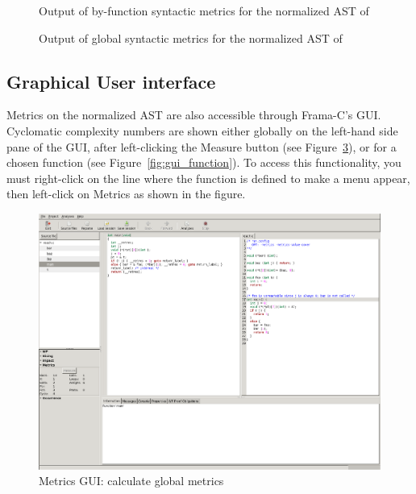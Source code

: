 \documentclass{frama-c-book}
\begin{document}
\begin{figure}[!ht]
  \centering
  
  \caption{Output of by-function syntactic metrics for the normalized AST of \pgname}
  \label{fig:cprog_output}
\end{figure}

\begin{figure}[!ht]
  \centering
  
  \caption{Output of global syntactic metrics for the normalized AST of \pgname}
  \label{fig:cprog_output2}
\end{figure}

\subsection{Graphical User interface}
\label{sec:gui}

Metrics on the normalized AST are also accessible through Frama-C's
GUI. Cyclomatic complexity numbers are shown either globally on the left-hand
side pane of the GUI, after left-clicking the {\sf Measure} button (see
Figure~\ref{fig:gui_global}), or for a chosen function (see
Figure~\ref{fig:gui_function}). To access this functionality, you must
right-click on the line  where the function is defined to make a menu appear,
then left-click on {\sf Metrics} as shown in the figure.

\begin{figure}[!ht]
  \centering
  \includegraphics[width=\linewidth]{img/metrics_gui_global.png}
  \caption{Metrics GUI: calculate global metrics}
  \label{fig:gui_global}
\end{figure}
\end{document}
